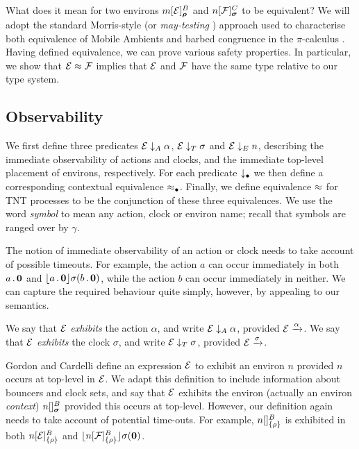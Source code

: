 \documentclass[orivec,envcountsame]{llncs}
\begin{document}
What does it mean for two environs $\locv{m}{\expr}{B}{\vec\rho}$ and
$\locv{n}{\exprb}{C}{\vec\sigma}$ to be equivalent? We will adopt the standard
Morris-style \cite{Mor68} (or \emph{may-testing} \cite{DNH84}) approach used to
characterise both equivalence of Mobile Ambients \cite{GC99} and barbed
congruence in the $\pi$-calculus \cite{sangiorgi:book}. Having defined
equivalence, we can prove various safety properties. In particular, we show that
$\text{$\mathcal{E}$} \approx \text{$\mathcal{F}$}$ implies that $\text{$\mathcal{E}$}$ and $\text{$\mathcal{F}$}$ have the same type relative
to our type system.

\subsection{Observability}
\label{sec:observability}

We first define three predicates $\text{$\mathcal{E}$} \mathrel{\downarrow_{A}} \alpha$, $\text{$\mathcal{E}$} \mathrel{\downarrow_{T}}
\sigma$ and $\text{$\mathcal{E}$} \mathrel{\downarrow_{E}} n$, describing the immediate observability of
actions and clocks, and the immediate top-level placement of environs,
respectively. For each predicate $\mathrel{\downarrow_{\bullet}}$ we then define a
corresponding contextual equivalence $\approx_{\bullet}$. Finally, we define
equivalence $\approx$ for TNT processes to be the conjunction of these three
equivalences. We use the word \emph{symbol} to mean any action, clock or environ
name; recall that symbols are ranged over by $\gamma$.

The notion of immediate observability of an action or clock needs to take
account of possible timeouts. For example, the action $a$ can occur immediately
in both $a\,.\,\textbf{0}$ and $\lfloor{a\,.\,\textbf{0}}\rfloor {\sigma} ({b\,.\,\textbf{0}})$, while the
action $b$ can occur immediately in neither. We can capture the required
behaviour quite simply, however, by appealing to our semantics.

\begin{definition}
We say that $\text{$\mathcal{E}$}$ \emph{exhibits} the action $\alpha$, and write $\text{$\mathcal{E}$}
\mathrel{\downarrow_{A}} \alpha$, provided $\text{$\mathcal{E}$} \xrightarrow{\alpha}$. We say that $\text{$\mathcal{E}$}$
\emph{exhibits} the clock $\sigma$, and write $\text{$\mathcal{E}$} \mathrel{\downarrow_{T}} \sigma$,
provided $\text{$\mathcal{E}$} \xrightarrow{\sigma}$.
\end{definition}

Gordon and Cardelli \cite{GC99} define an expression $\text{$\mathcal{E}$}$ to exhibit an
environ $n$ provided $n$ occurs at top-level in $\text{$\mathcal{E}$}$. We adapt this
definition to include information about bouncers and clock sets, and say that
$\text{$\mathcal{E}$}$ exhibits the environ (actually an environ \emph{context})
$\locv{n}{}{B}{\vec{\sigma}}$ provided this occurs at top-level. However, our
definition again needs to take account of potential time-outs. For example,
${n}[  ]^{B}_{\{\rho\}}$ is exhibited in both ${n}[ \text{$\mathcal{E}$} ]^{B}_{\{\rho\}}$ and
$\lfloor{{n}[ \text{$\mathcal{F}$}]^{B}_{\{\rho\}}}\rfloor {\sigma} ({\textbf{0}})$.
\end{document}
